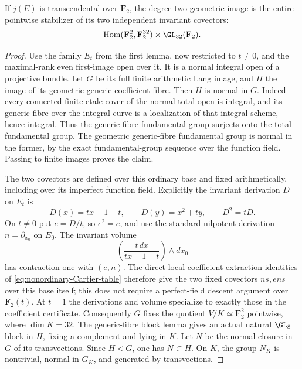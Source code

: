\begin{lemma}
\label{lem:generic-mixed-degree-two-group-candidate}
If $j(E)$ is transcendental over $\mathbf F_2$, the degree-two
geometric image is the entire pointwise stabilizer of its
two independent invariant covectors:
\[
                 \operatorname{Hom}(\mathbf F_2^2,\mathbf F_2^{32})
                          \rtimes\GL_{32}(\mathbf F_2).
\]
\end{lemma}

\begin{proof}
Use the family $E_t$ from the first lemma, now restricted to
$t\ne0$, and the maximal-rank even first-image open over it.
It is a normal integral open of a projective bundle. Let $G$
be its full finite arithmetic Lang image, and $H$ the image
of its geometric generic coefficient fibre.
Then $H$ is normal in $G$. Indeed every connected finite
etale cover of the normal total open is integral, and its
generic fibre over the integral curve is a localization of
that integral scheme, hence integral. Thus the generic-fibre
fundamental group surjects onto the total fundamental group.
The geometric generic-fibre fundamental group is normal in
the former, by the exact fundamental-group sequence over
the function field. Passing to finite images proves the claim.

The two covectors are defined over this ordinary base and
fixed arithmetically, including over its imperfect function
field. Explicitly the invariant derivation $D$ on $E_t$ is
\[
 D(x)=tx+1+t,\qquad D(y)=x^2+ty,\qquad D^2=tD.
\]
On $t\ne0$ put $e=D/t$, so $e^2=e$, and use the standard
nilpotent derivation $n=\partial_{x_0}$ on $E_0$.
The invariant volume
\[
             \left(\frac{t\,dx}{tx+1+t}\right)\wedge dx_0
\]
has contraction one with $(e,n)$. The direct local
coefficient-extraction identities of
\eqref{eq:nonordinary-Cartier-table} therefore give the two
fixed covectors $ns,ens$ over this base itself; this does not
require a perfect-field descent argument over $\mathbf F_2(t)$.
At $t=1$ the derivations and volume specialize to exactly
those in the coefficient certificate.
Consequently $G$ fixes the quotient $V/K\simeq\mathbf F_2^2$
pointwise, where $\dim K=32$.
The generic-fibre block lemma gives an actual natural
$\GL_8$ block in $H$, fixing a complement and lying in $K$.
Let $N$ be the normal closure in $G$ of its transvections.
Since $H\triangleleft G$, one has $N\subset H$.
On $K$, the group $N_K$ is nontrivial, normal in $G_K$,
and generated by transvections.


\end{proof}
